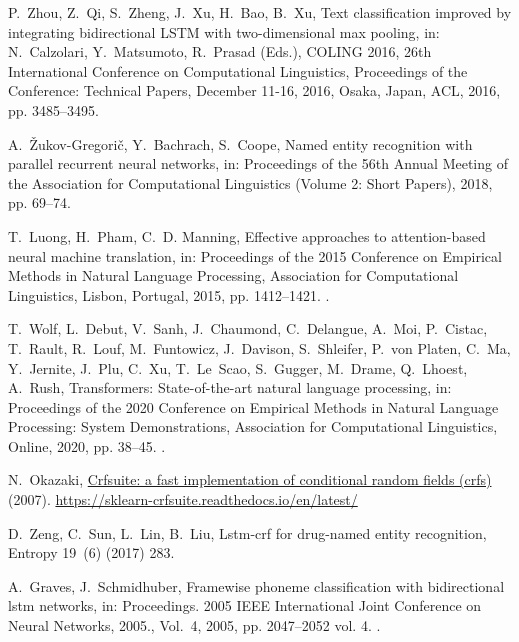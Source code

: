 \documentclass[preprint,12pt]{elsarticle}
\begin{document}
\begin{thebibliography}{10}
P.~Zhou, Z.~Qi, S.~Zheng, J.~Xu, H.~Bao, B.~Xu, Text classification improved by
  integrating bidirectional {LSTM} with two-dimensional max pooling, in:
  N.~Calzolari, Y.~Matsumoto, R.~Prasad (Eds.), {COLING} 2016, 26th
  International Conference on Computational Linguistics, Proceedings of the
  Conference: Technical Papers, December 11-16, 2016, Osaka, Japan, {ACL},
  2016, pp. 3485--3495.

A.~{\v{Z}}ukov-Gregori{\v{c}}, Y.~Bachrach, S.~Coope, Named entity recognition
  with parallel recurrent neural networks, in: Proceedings of the 56th Annual
  Meeting of the Association for Computational Linguistics (Volume 2: Short
  Papers), 2018, pp. 69--74.

T.~Luong, H.~Pham, C.~D. Manning, Effective approaches to attention-based
  neural machine translation, in: Proceedings of the 2015 Conference on
  Empirical Methods in Natural Language Processing, Association for
  Computational Linguistics, Lisbon, Portugal, 2015, pp. 1412--1421.
\newblock \href {https://doi.org/10.18653/v1/D15-1166}
  {}.

T.~Wolf, L.~Debut, V.~Sanh, J.~Chaumond, C.~Delangue, A.~Moi, P.~Cistac,
  T.~Rault, R.~Louf, M.~Funtowicz, J.~Davison, S.~Shleifer, P.~von Platen,
  C.~Ma, Y.~Jernite, J.~Plu, C.~Xu, T.~Le~Scao, S.~Gugger, M.~Drame, Q.~Lhoest,
  A.~Rush, Transformers: State-of-the-art natural language processing, in:
  Proceedings of the 2020 Conference on Empirical Methods in Natural Language
  Processing: System Demonstrations, Association for Computational Linguistics,
  Online, 2020, pp. 38--45.
\newblock \href {https://doi.org/10.18653/v1/2020.emnlp-demos.6}
  {}.

N.~Okazaki, \href{https://sklearn-crfsuite.readthedocs.io/en/latest/}{Crfsuite:
  a fast implementation of conditional random fields (crfs)} (2007).
\newline\urlprefix\url{https://sklearn-crfsuite.readthedocs.io/en/latest/}

D.~Zeng, C.~Sun, L.~Lin, B.~Liu, Lstm-crf for drug-named entity recognition,
  Entropy 19~(6) (2017) 283.

A.~Graves, J.~Schmidhuber, Framewise phoneme classification with bidirectional
  lstm networks, in: Proceedings. 2005 IEEE International Joint Conference on
  Neural Networks, 2005., Vol.~4, 2005, pp. 2047--2052 vol. 4.
\newblock \href {https://doi.org/10.1109/IJCNN.2005.1556215}
  {}.


\end{thebibliography}
\end{document}
